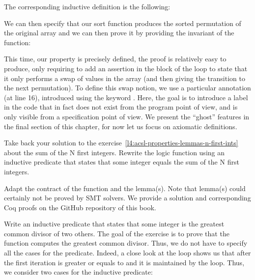 The corresponding inductive definition is the following:




We can then specify that our sort function produces the sorted permutation of
the original array and we can then prove it by providing the invariant of the
function:





This time, our property is precisely defined, the proof is relatively easy to
produce, only requiring to add an assertion in the block of the loop to state
that it only performs a swap of values in the array (and then giving
the transition to the next permutation). To define this swap notion, we use
a particular annotation (at line 16), introduced using the keyword
. Here, the goal is to introduce a label in the code that in
fact does not exist from the program point of view, and is only visible from
a specification point of view. We present the ``ghost'' features in the final
section of this chapter, for now let us focus on axiomatic definitions.







Take back your solution to the
exercise~\ref{l4:acsl-properties-lemmas-n-first-ints} about the sum of the N
first integers. Rewrite the logic function using an inductive predicate that
states that some integer equals the sum of the N first integers.




Adapt the contract of the function and the lemma(s). Note that lemma(s) could
certainly not be proved by SMT solvers. We provide a solution and corresponding
Coq proofs on the GitHub repository of this book.




Write an inductive predicate that states that some integer is the greatest common
divisor of two others. The goal of the exercise is to prove that the function
 computes the greatest common divisor. Thus, we do not have to
specify all the cases for the predicate. Indeed, a close look at the loop shows
us that after the first iteration  is greater or equals to
 and it is maintained by the loop. Thus, we consider two cases for
the inductive predicate:



